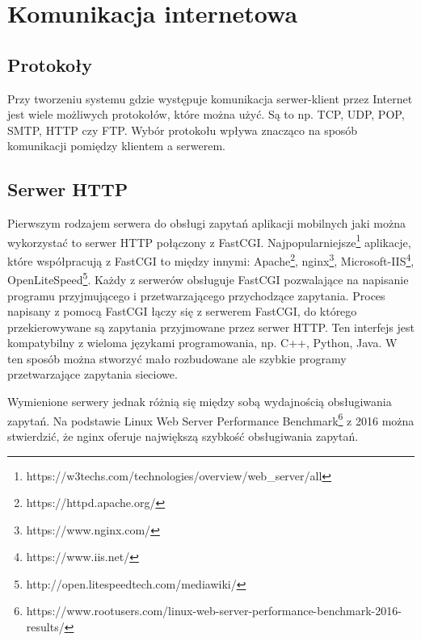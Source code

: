 \documentclass{report}
\begin{document}
		\section{Komunikacja internetowa}
		
			\subsection{Protokoły}
			Przy tworzeniu systemu gdzie występuje komunikacja serwer-klient przez Internet jest wiele możliwych protokołów, które można użyć. Są to np. TCP, UDP, POP, SMTP, HTTP czy FTP. Wybór protokołu wpływa znacząco na sposób komunikacji pomiędzy klientem a serwerem.
	
			\subsection{Serwer HTTP}
			Pierwszym rodzajem serwera do obsługi zapytań aplikacji mobilnych jaki można wykorzystać to serwer HTTP połączony z FastCGI. Najpopularniejsze\footnote{https://w3techs.com/technologies/overview/web\_server/all} aplikacje, które współpracują z FastCGI to między innymi: Apache\footnote{https://httpd.apache.org/}, nginx\footnote{https://www.nginx.com/}, Microsoft-IIS\footnote{https://www.iis.net/}, OpenLiteSpeed\footnote{http://open.litespeedtech.com/mediawiki/}. Każdy z serwerów obsługuje FastCGI pozwalające na napisanie programu przyjmującego i przetwarzającego przychodzące zapytania. Proces napisany z pomocą FastCGI łączy się z serwerem FastCGI, do którego przekierowywane są zapytania przyjmowane przez serwer HTTP. Ten interfejs jest kompatybilny z wieloma językami programowania, np. C++, Python, Java. W ten sposób można stworzyć mało rozbudowane ale szybkie programy przetwarzające zapytania sieciowe.
		
			Wymienione serwery jednak różnią się między sobą wydajnością obsługiwania zapytań. Na podstawie Linux Web Server Performance Benchmark\footnote{https://www.rootusers.com/linux-web-server-performance-benchmark-2016-results/} z 2016 można stwierdzić, że nginx oferuje największą szybkość obsługiwania zapytań.
	
\end{document}

